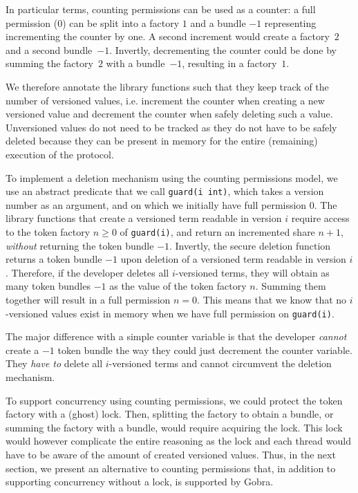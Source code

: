 In particular terms, counting permissions can be used as a counter: a full permission (0) can be split into a factory $1$ and a bundle $-1$ representing incrementing the counter by one.
A second increment would create a factory~$2$ and a second bundle~$-1$. Invertly, decrementing the counter could be done by summing the factory~$2$ with a bundle~$-1$, resulting in a factory~$1$.

We therefore annotate the library functions such that they keep track of the number of versioned values, i.e. increment the counter when creating a new versioned value and decrement the counter when safely deleting such a value.
Unversioned values do not need to be tracked as they do not have to be safely deleted because they can be present in memory for the entire (remaining) execution of the protocol.

To implement a deletion mechanism using the counting permissions model, we use an abstract predicate that we call \texttt{guard(i int)}, which takes a version number as an argument, and on which we initially have full permission $0$. The library functions that create a versioned term readable in version $i$ require access to the token factory $n\geq0$ of \texttt{guard(i)}, and return an incremented share $n+1$, \emph{without} returning the token bundle $-1$. Invertly, the secure deletion function returns a token bundle $-1$ upon deletion of a versioned term readable in version $i$. Therefore, if the developer deletes all $i$-versioned terms, they will obtain as many token bundles $-1$ as the value of the token factory $n$. Summing them together will result in a full permission $n = 0$. This means that we know that no $i$-versioned values exist in memory when we have full permission on \texttt{guard(i)}.

The major difference with a simple counter variable is that the developer \emph{cannot} create a $-1$ token bundle the way they could just decrement the counter variable. They \emph{have to} delete all $i$-versioned terms and cannot circumvent the deletion mechanism.

To support concurrency using counting permissions, we could protect the token factory with a (ghost) lock.
Then, splitting the factory to obtain a bundle, or summing the factory with a bundle, would require acquiring the lock.
This lock would however complicate the entire reasoning as the lock and each thread would have to be aware of the amount of created versioned values.
Thus, in the next section, we present an alternative to counting permissions that, in addition to supporting concurrency without a lock, is supported by Gobra.

